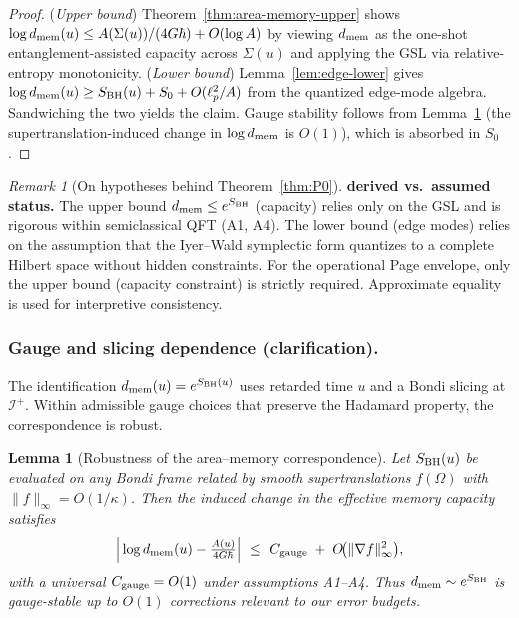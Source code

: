 \documentclass[11pt,a4paper]{article}
\theoremstyle{plain}
\newtheorem{lemma}[theorem]{Lemma}
\theoremstyle{definition}
\theoremstyle{remark}
\newtheorem{remark}[theorem]{Remark}
\begin{document}
\begin{proof}
(\emph{Upper bound}) Theorem~\ref{thm:area-memory-upper} shows $\log d_{\rm mem}(u)\le A(\Sigma(u))/(4G\hbar)+O(\log A)$ by viewing $d_{\rm mem}$ as the one-shot entanglement-assisted capacity across $\Sigma(u)$ and applying the GSL via relative-entropy monotonicity.
(\emph{Lower bound}) Lemma~\ref{lem:edge-lower} gives $\log d_{\rm mem}(u)\ge S_{\rm BH}(u)+S_0+O(\ell_p^2/A)$ from the quantized edge-mode algebra.
Sandwiching the two yields the claim. Gauge stability follows from Lemma~\ref{lem:gauge-robustness} (the supertranslation-induced change in $\log d_{\rm mem}$ is $O(1)$), which is absorbed in $S_0$.
\end{proof}

\begin{remark}[On hypotheses behind Theorem~\ref{thm:P0}]\label{rem:P0-hypotheses}
\textbf{derived vs.\ assumed status.} The upper bound $d_{\rm mem} \le e^{S_{\rm BH}}$ (capacity) relies only on the GSL and is rigorous within semiclassical QFT (A1, A4).
The lower bound (edge modes) relies on the assumption that the Iyer--Wald symplectic form quantizes to a complete Hilbert space without hidden constraints.
For the operational Page envelope, only the upper bound (capacity constraint) is strictly required.
Approximate equality is used for interpretive consistency.
\end{remark}

\subsubsection{Gauge and slicing dependence (clarification).}
The identification \(d_{\rm mem}(u)=e^{S_{\rm BH}(u)}\) uses retarded time \(u\) and a Bondi slicing at \(\mathcal{I}^+\).
Within admissible gauge choices that preserve the Hadamard property, the correspondence is robust.

\begin{lemma}[Robustness of the area--memory correspondence]\label{lem:gauge-robustness}
Let \(S_{\rm BH}(u)\) be evaluated on any Bondi frame related by smooth supertranslations \(f(\Omega)\) with \(\|f\|_\infty=O(1/\kappa)\).
Then the induced change in the effective memory capacity satisfies
\[
\Big|\log d_{\rm mem}(u)-\tfrac{A(u)}{4G\hbar}\Big|\ \le\ C_{\rm gauge}\;+\;O\!\big(\|\nabla f\|_\infty^2\big),
\]
with a universal \(C_{\rm gauge}=O(1)\) under assumptions A1--A4.
Thus \(d_{\rm mem}\sim e^{S_{\rm BH}}\) is gauge-stable up to \(O(1)\) corrections relevant to our error budgets.
\end{lemma}
\end{document}
